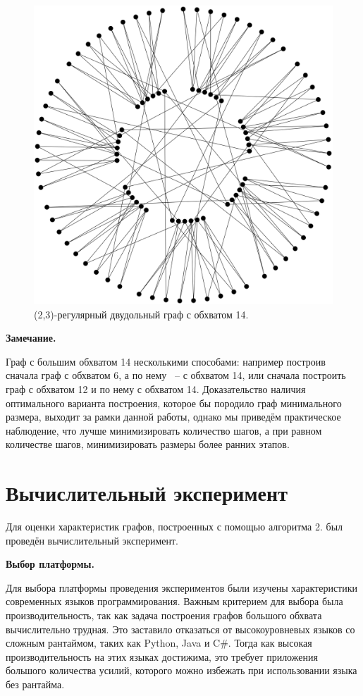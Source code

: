 \documentclass[14pt]{mmcs-article}
\begin{document}
\begin{figure}[H]
    \centering
    \includegraphics[scale=0.2]{graph_3.png}
    \caption{ (2,3)-регулярный двудольный граф с обхватом 14. }
    \label{be_not_afraid_2}
\end{figure}

\textbf{Замечание.}

Граф с большим обхватом 14 несколькими способами: например построив сначала граф с обхватом 6, а по нему ~-- с обхватом 14, или сначала построить граф с обхватом 12 и по нему с обхватом 14. Доказательство наличия оптимального варианта построения, которое бы породило граф минимального размера, выходит за рамки данной работы, однако мы приведём практическое наблюдение, что лучше минимизировать количество шагов, а при равном количестве шагов, минимизировать размеры более ранних этапов.

\section{Вычислительный эксперимент}

Для оценки характеристик графов, построенных с помощью алгоритма 2. был проведён вычислительный эксперимент.

\textbf{Выбор платформы.}

Для выбора платформы проведения экспериментов были изучены характеристики современных языков программирования. Важным критерием для выбора была производительность, так как задача построения графов большого обхвата вычислительно трудная. Это заставило отказаться от высокоуровневых языков со сложным рантаймом, таких как Python, Java и C\#. Тогда как высокая производительность на этих языках достижима, это требует приложения большого количества усилий, которого можно избежать при использовании языка без рантайма.
\end{document}
